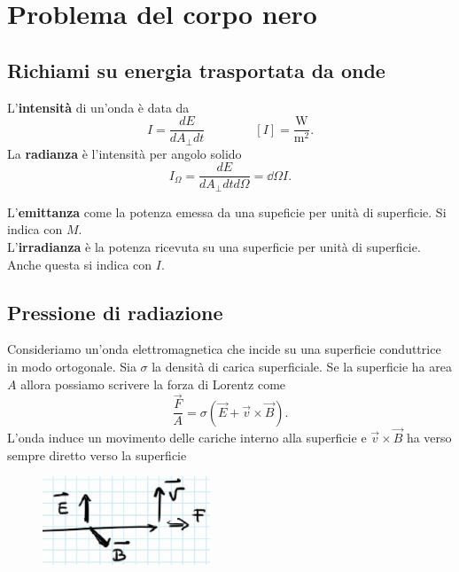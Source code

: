 \chapter{Problema del corpo nero}

\section{Richiami su energia trasportata da onde}
\begin{definition}[Intensit\`a]
L'\textbf{intensit\`a} di un'onda \`e data da
\[I=\frac{dE}{dA_\perp dt}\qquad\qquad [I]=\frac{\mathrm{W}}{\mathrm{m}^{2}}.\]
La \textbf{radianza} \`e l'intensit\`a per angolo solido
\[I_\Omega=\frac{dE}{dA_\perp dtd\Omega}=\dd \Omega I.\]
\end{definition}

\begin{definition}
L'\textbf{emittanza} come la potenza emessa da una supeficie per unit\`a di superficie. Si indica con $M$.\\
L'\textbf{irradianza} \`e la potenza ricevuta su una superficie per unit\`a di superficie. Anche questa si indica con $I$.
\end{definition}

\section{Pressione di radiazione}
Consideriamo un'onda elettromagnetica che incide su una superficie conduttrice in modo ortogonale. Sia $\sigma$ la densit\`a di carica superficiale. Se la superficie ha area $A$ allora possiamo scrivere la forza di Lorentz come
\[\frac{\vec F}A=\sigma(\vec E+\vec v\times \vec B).\]
L'onda induce un movimento delle cariche interno alla superficie e $\vec v\times \vec B$ ha verso sempre diretto verso la superficie

\begin{figure}[!htb]
    \centering
    \includegraphics[width=5cm]{images/onda_elettromagnetica_che_incide_ortogonalmente.png}
\end{figure}

